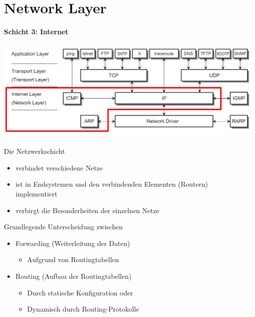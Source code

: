 \section{Network Layer}
\paragraph{Schicht 3: Internet}

\includegraphics[width=1\linewidth]{images/orientierung_network_layer.png}

\begin{definition}{Die Netzwerkschicht}
    \begin{itemize}
        \item verbindet verschiedene Netze
        \item ist in Endsystemen und den verbindenden Elementen (Routern) implementiert
        \item verbirgt die Besonderheiten der einzelnen Netze
    \end{itemize}
    Grundlegende Unterscheidung zwischen
    \begin{itemize}
        \item Forwarding (Weiterleitung der Daten)
        \begin{itemize}
            \item Aufgrund von Routingtabellen
        \end{itemize}
        \item Routing (Aufbau der Routingtabellen)
        \begin{itemize}
            \item Durch statische Konfiguration oder
            \item Dynamisch durch Routing-Protokolle
        \end{itemize}
    \end{itemize}
\end{definition}

